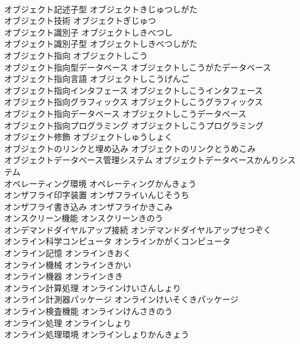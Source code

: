 \documentclass[8pt]{extreport}
\begin{document}
\begin{CJK}{UTF8}{min}
\\	オブジェクト記述子型	オブジェクトきじゅつしがた	
\\	オブジェクト技術	オブジェクトぎじゅつ	
\\	オブジェクト識別子	オブジェクトしきべつし	
\\	オブジェクト識別子型	オブジェクトしきべつしがた	
\\	オブジェクト指向	オブジェクトしこう	
\\	オブジェクト指向型データベース	オブジェクトしこうがたデータベース	
\\	オブジェクト指向言語	オブジェクトしこうげんご	
\\	オブジェクト指向インタフェース	オブジェクトしこうインタフェース	
\\	オブジェクト指向グラフィックス	オブジェクトしこうグラフィックス	
\\	オブジェクト指向データベース	オブジェクトしこうデータベース	
\\	オブジェクト指向プログラミング	オブジェクトしこうプログラミング	
\\	オブジェクト修飾	オブジェクトしゅうしょく	
\\	オブジェクトのリンクと埋め込み	オブジェクトのリンクとうめこみ	
\\	オブジェクトデータベース管理システム	オブジェクトデータベースかんりシステム	
\\	オペレーティング環境	オペレーティングかんきょう	
\\	オンザフライ印字装置	オンザフライいんじそうち	
\\	オンザフライ書き込み	オンザフライかきこみ	
\\	オンスクリーン機能	オンスクリーンきのう	
\\	オンデマンドダイヤルアップ接続	オンデマンドダイヤルアップせつぞく	
\\	オンライン科学コンピュータ	オンラインかがくコンピュータ	
\\	オンライン記憶	オンラインきおく	
\\	オンライン機械	オンラインきかい	
\\	オンライン機器	オンラインきき	
\\	オンライン計算処理	オンラインけいさんしょり	
\\	オンライン計測器パッケージ	オンラインけいそくきパッケージ	
\\	オンライン検査機能	オンラインけんさきのう	
\\	オンライン処理	オンラインしょり	
\\	オンライン処理環境	オンラインしょりかんきょう	

\end{CJK}
\end{document}
